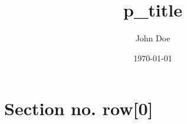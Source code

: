 \documentclass{beamer}
\begin{document}
\title{ {{ p_title }} }
\author{John Doe}
\date{\today} 

\frame{\titlepage} 


\section{Section no. {{ row[0] }} } 
\end{document}

